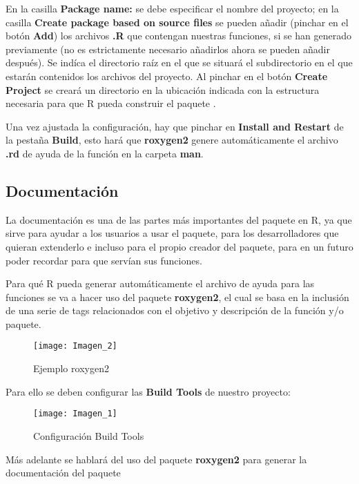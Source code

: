 En la casilla \textbf{Package name:} se debe especificar el nombre del  proyecto; en la casilla
\textbf{Create package based on source files} se pueden a\~nadir (pinchar en el bot\'on \textbf{Add}) los
archivos \textbf{.R} que contengan nuestras funciones, si se han generado previamente (no es
estrictamente necesario a\~nadirlos ahora se pueden a\~nadir despu\'es).
Se ind\'ica el directorio ra\'iz en el que se situar\'a el subdirectorio en el que estar\'an contenidos los archivos del proyecto. 
Al pinchar en el bot\'on \textbf{Create Project} se crear\'a un directorio en la ubicaci\'on indicada con la
estructura necesaria para que R pueda construir el paquete \cite{datavu}.

Una vez ajustada la configuraci\'on, hay que pinchar en \textbf{Install and Restart} de la pesta\~na \textbf{Build}, esto har\'a que \textbf{roxygen2} genere autom\'aticamente el archivo \textbf{.rd} de ayuda de la funci\'on en la carpeta \textbf{man}.

\subsection{Documentaci\'on}
La documentaci\'on es una de las partes m\'as importantes del paquete en R, ya que sirve para ayudar a los usuarios a usar el paquete, para los desarrolladores que quieran extenderlo e
incluso para el propio creador del paquete, para en un futuro poder recordar para que serv\'ian sus funciones.

Para qu\'e R pueda generar autom\'aticamente el archivo de ayuda para las funciones
se va a hacer uso del paquete \textbf{roxygen2}, el cual se basa en la inclusi\'on de una serie de tags relacionados con el objetivo y descripci\'on de la funci\'on y/o paquete. 


\begin{figure}[H]
    \centering
    \texttt{[image: Imagen\_2]}
    \caption{Ejemplo roxygen2   }
    \label{fig:roxygen}
\end{figure} 

Para ello se deben configurar las \textbf{Build Tools} de nuestro proyecto:

\begin{figure}[H]
    \centering
    \texttt{[image: Imagen\_1]}
    \caption{Configuraci\'on Build Tools }
    \label{fig:build_tools}
\end{figure} 

M\'as adelante se hablar\'a del uso del paquete \textbf{roxygen2} para generar la documentaci\'on del paquete

